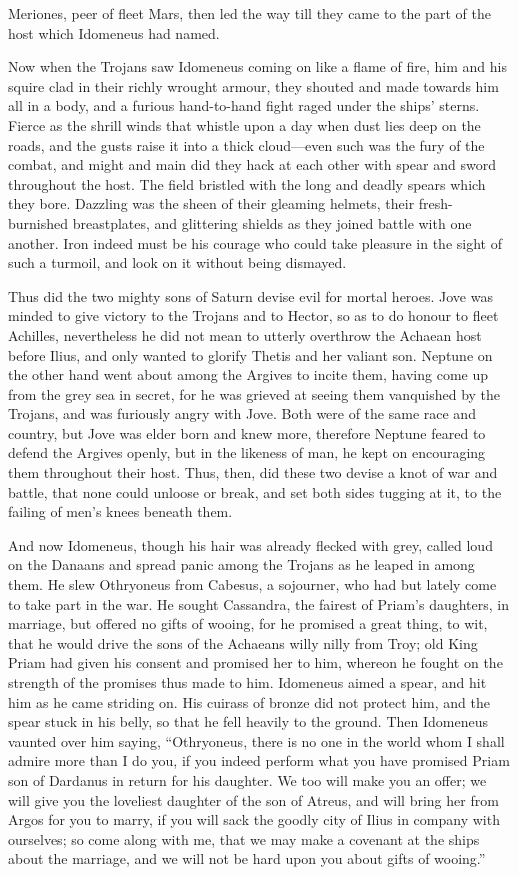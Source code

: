 Meriones, peer of fleet Mars, then led the way till they came to the part
of the host which Idomeneus had named.

Now when the Trojans saw Idomeneus coming on like a flame of fire, him and
his squire clad in their richly wrought armour, they shouted and made
towards him all in a body, and a furious hand-to-hand fight raged under
the ships’ sterns. Fierce as the shrill winds that whistle upon a day when
dust lies deep on the roads, and the gusts raise it into a thick cloud—even
such was the fury of the combat, and might and main did they hack at each
other with spear and sword throughout the host. The field bristled with
the long and deadly spears which they bore. Dazzling was the sheen of
their gleaming helmets, their fresh-burnished breastplates, and glittering
shields as they joined battle with one another. Iron indeed must be his
courage who could take pleasure in the sight of such a turmoil, and look
on it without being dismayed.

Thus did the two mighty sons of Saturn devise evil for mortal heroes. Jove
was minded to give victory to the Trojans and to Hector, so as to do
honour to fleet Achilles, nevertheless he did not mean to utterly
overthrow the Achaean host before Ilius, and only wanted to glorify Thetis
and her valiant son. Neptune on the other hand went about among the
Argives to incite them, having come up from the grey sea in secret, for he
was grieved at seeing them vanquished by the Trojans, and was furiously
angry with Jove. Both were of the same race and country, but Jove was
elder born and knew more, therefore Neptune feared to defend the Argives
openly, but in the likeness of man, he kept on encouraging them throughout
their host. Thus, then, did these two devise a knot of war and battle,
that none could unloose or break, and set both sides tugging at it, to the
failing of men’s knees beneath them.

And now Idomeneus, though his hair was already flecked with grey, called
loud on the Danaans and spread panic among the Trojans as he leaped in
among them. He slew Othryoneus from Cabesus, a sojourner, who had but
lately come to take part in the war. He sought Cassandra, the fairest of
Priam’s daughters, in marriage, but offered no gifts of wooing, for he
promised a great thing, to wit, that he would drive the sons of the
Achaeans willy nilly from Troy; old King Priam had given his consent and
promised her to him, whereon he fought on the strength of the promises
thus made to him. Idomeneus aimed a spear, and hit him as he came striding
on. His cuirass of bronze did not protect him, and the spear stuck in his
belly, so that he fell heavily to the ground. Then Idomeneus vaunted over
him saying, “Othryoneus, there is no one in the world whom I shall admire
more than I do you, if you indeed perform what you have promised Priam son
of Dardanus in return for his daughter. We too will make you an offer; we
will give you the loveliest daughter of the son of Atreus, and will bring
her from Argos for you to marry, if you will sack the goodly city of Ilius
in company with ourselves; so come along with me, that we may make a
covenant at the ships about the marriage, and we will not be hard upon you
about gifts of wooing.”

